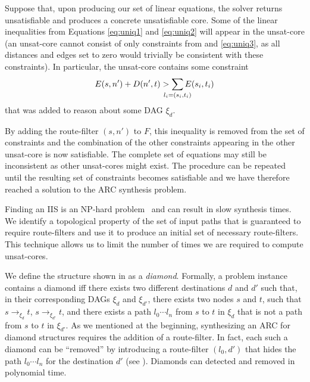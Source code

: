 Suppose that, upon producing our set of linear equations, the solver returns unsatisfiable and produces
a concrete unsatisfiable core. 
Some of the linear inequalities from 
Equations \eqref{eq:uniq1} and  \eqref{eq:uniq2}
will appear in the unsat-core 
(an unsat-core cannot consist of only 
constraints from  and \eqref{eq:uniq3}, as all distances and edges set to zero
would trivially be consistent with these constraints). 
In particular, the unsat-core contains some constraint
\begin{eqnarray}
E(s, n') + D(n', t) > \sum_{\mathclap{\substack{l_i=(s_i,t_i)}}} 
		E(s_i, t_i) 
\end{eqnarray}
that was added to reason about some DAG $\xi_d$.

By adding the route-filter $(s,n')$ to $F$, this inequality is removed from the set of constraints
and the combination of the other constraints appearing in the other unsat-core is now satisfiable.
The complete set of equations may still be inconsistent as other unsat-cores might exist. 
The procedure can be repeated until the resulting set of constraints becomes satisfiable
and we have therefore reached a solution to the ARC synthesis problem.


Finding an IIS is an NP-hard problem~\cite{iiscomplexity}
and can result in slow synthesis times.
We identify a topological property of the set of input paths that 
is guaranteed to require route-filters and use it to produce an initial set of necessary route-filters.
This technique allows us to limit the number of times we are required to compute  unsat-cores.

We define the structure shown in 
as a \emph{diamond}. 
Formally, a problem instance contains a diamond iff there exists two different destinations $d$ and $d'$
such that, in their corresponding DAGs $\xi_d$ and $\xi_{d'}$,
there exists two nodes $s$ and $t$, such that $s\rightarrow_{\xi_d} t$,
$s\rightarrow_{\xi_{d'}} t$, and
there exists a path $l_0\cdots l_n$ from $s$ to $t$ in $\xi_d$ that is not a path from
$s$ to $t$ in $\xi_{d'}$.
As we mentioned at the beginning, synthesizing an ARC for  diamond structures requires
the addition of a route-filter.
In fact, each such a diamond can be ``removed'' by introducing a route-filter $(l_0, d')$ that hides
the path $l_0\cdots l_n$ for the destination $d'$ (see ).
Diamonds can detected and removed in polynomial time.

